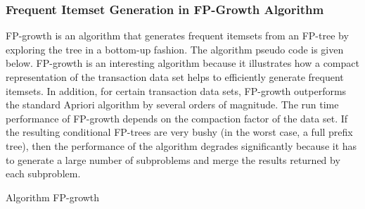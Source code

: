 \documentclass{article}\usepackage[]{graphicx}\usepackage[]{color}
\begin{document}
\subsubsection{Frequent Itemset Generation in FP-Growth Algorithm}\hspace{0.9cm}FP-growth is an algorithm that generates frequent itemsets from an FP-tree by exploring the tree in a bottom-up fashion. The algorithm pseudo code is given below. FP-growth is an interesting algorithm because it illustrates how a compact representation of the transaction data set helps to efficiently generate frequent itemsets. In addition, for certain transaction data sets, FP-growth outperforms the standard Apriori algorithm by several orders of magnitude. The run time performance of FP-growth depends on the compaction factor of the data set. If the resulting conditional FP-trees are very bushy (in the worst case, a full prefix tree), then the performance of the algorithm degrades significantly because it has to generate a large number of subproblems and merge the results returned by each subproblem.\\
\begin{algorithm}
\caption{Algorithm FP-growth}
\label{CHalgorithm}
\end{algorithm}
\end{document}
